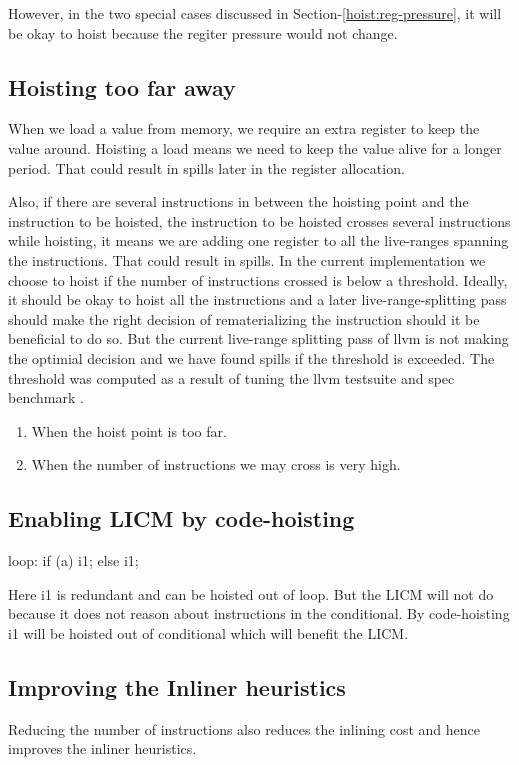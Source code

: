 \documentclass{sig-alternate}
\begin{document}
However, in the two special cases discussed in Section-\ref{hoist:reg-pressure},
it will be okay to hoist because the regiter pressure would not change.


\subsection{Hoisting too far away}
When we load a value from memory, we require an extra register to keep the value
around. Hoisting a load means we need to keep the value alive for a longer
period. That could result in spills later in the register allocation.

Also, if there are several instructions in between the hoisting point and the
instruction to be hoisted, the instruction to be hoisted crosses several
instructions while hoisting, it means we are adding one register to all the
live-ranges spanning the instructions. That could result in spills. In the
current implementation we choose to hoist if the number of instructions crossed
is below a threshold. Ideally, it should be okay to hoist all the instructions
and a later live-range-splitting pass should make the right decision of
rematerializing the instruction should it be beneficial to do so. But the
current live-range splitting pass of llvm is not making the optimial decision
and we have found spills if the threshold is exceeded. The threshold was
computed as a result of tuning the llvm testsuite \cite{llvm-nightly} and spec
benchmark \cite{Henning2000}.

\begin{enumerate}
\item When the hoist point is too far.
\item When the number of instructions we may cross is very high.
\end{enumerate}

\subsection{Enabling LICM by code-hoisting}
loop:
if (a)
  i1;
else
  i1;

Here i1 is redundant and can be hoisted out of loop. But the LICM will
not do because it does not reason about instructions in the
conditional.  By code-hoisting i1 will be hoisted out of conditional
which will benefit the LICM.

\subsection{Improving the Inliner heuristics}
Reducing the number of instructions also reduces the inlining cost and
hence improves the inliner heuristics.
\end{document}
